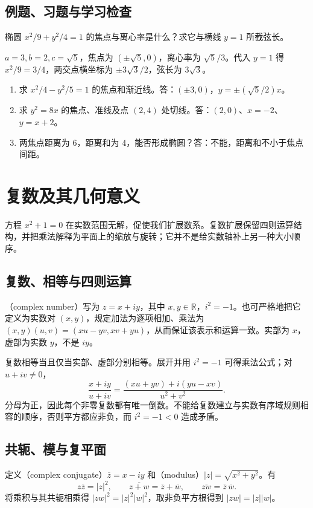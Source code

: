 \documentclass[UTF8]{ctexbook}
\begin{document}
\section{例题、习题与学习检查}
\begin{example}
椭圆 $x^2/9+y^2/4=1$ 的焦点与离心率是什么？求它与横线 $y=1$ 所截弦长。
\end{example}
\begin{solve}
$a=3,b=2,c=\sqrt5$，焦点为 $(\pm\sqrt5,0)$，离心率为 $\sqrt5/3$。代入 $y=1$ 得 $x^2/9=3/4$，两交点横坐标为 $\pm3\sqrt3/2$，弦长为 $3\sqrt3$。
\end{solve}
\begin{enumerate}
\item 求 $x^2/4-y^2/5=1$ 的焦点和渐近线。答：$(\pm3,0)$，$y=\pm(\sqrt5/2)x$。
\item 求 $y^2=8x$ 的焦点、准线及点 $(2,4)$ 处切线。答：$(2,0)$、$x=-2$、$y=x+2$。
\item 两焦点距离为 $6$，距离和为 $4$，能否形成椭圆？答：不能，距离和不小于焦点间距。
\end{enumerate}

\chapter{复数及其几何意义}
\label{chap:em-complex}
方程 $x^2+1=0$ 在实数范围无解，促使我们扩展数系。复数扩展保留四则运算结构，并把乘法解释为平面上的缩放与旋转；它并不是给实数轴补上另一种大小顺序。

\section{复数、相等与四则运算}
（complex number）写为 $z=x+iy$，其中 $x,y\in\mathbb R$，$i^2=-1$。也可严格地把它定义为实数对 $(x,y)$，规定加法为逐项相加、乘法为 $(x,y)(u,v)=(xu-yv,xv+yu)$，从而保证该表示和运算一致。实部为 $x$，虚部为实数 $y$，不是 $iy$。

复数相等当且仅当实部、虚部分别相等。展开并用 $i^2=-1$ 可得乘法公式；对 $u+iv\ne0$，
\[
 \frac{x+iy}{u+iv}=
 \frac{(xu+yv)+i(yu-xv)}{u^2+v^2}.
\]
分母为正，因此每个非零复数都有唯一倒数。不能给复数建立与实数有序域规则相容的顺序，否则平方都应非负，而 $i^2=-1<0$ 造成矛盾。

\section{共轭、模与复平面}
定义（complex conjugate）$\overline z=x-iy$ 和（modulus）$|z|=\sqrt{x^2+y^2}$。有
\[
 z\overline z=|z|^2,\qquad
 \overline{z+w}=\overline z+\overline w,\qquad
 \overline{zw}=\overline z\,\overline w.
\]
将乘积与其共轭相乘得 $|zw|^2=|z|^2|w|^2$，取非负平方根得到 $|zw|=|z||w|$。
\end{document}
